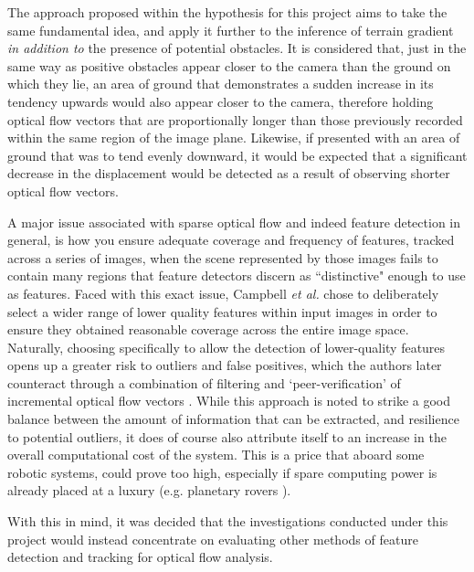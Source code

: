 The approach proposed within the hypothesis for this project aims to take the same fundamental idea, and apply it further to the inference of terrain gradient \textit{in addition to} the presence of potential obstacles. It is considered that, just in the same way as positive obstacles appear closer to the camera than the ground on which they lie, an area of ground that demonstrates a sudden increase in its tendency upwards would also appear closer to the camera, therefore holding optical flow vectors that are proportionally longer than those previously recorded within the same region of the image plane. Likewise, if presented with an area of ground that was to tend evenly downward, it would be expected that a significant decrease in the displacement would be detected as a result of observing shorter optical flow vectors.  


A major issue associated with sparse optical flow and indeed feature detection in general, is how you ensure adequate coverage and frequency of features, tracked across a series of images, when the scene represented by those images fails to contain many regions that feature detectors discern as ``distinctive" enough to use as features. Faced with this exact issue, Campbell \textit{et al.} \cite{campbell} chose to deliberately select a wider range of lower quality features within input images in order to ensure they obtained reasonable coverage across the entire image space. Naturally, choosing specifically to allow the detection of lower-quality features opens up a greater risk to outliers and false positives, which the authors later counteract through a combination of filtering and `peer-verification' of incremental optical flow vectors \cite{campbell}. While this approach is noted to strike a good balance between the amount of information that can be extracted, and resilience to potential outliers, it does of course also attribute itself to an increase in the overall computational cost of the system. This is a price that aboard some robotic systems, could prove too high, especially if spare computing power is already placed at a luxury (e.g. planetary rovers \cite{mer}).

With this in mind, it was decided that the investigations conducted under this project would instead concentrate on evaluating other methods of feature detection and tracking for optical flow analysis. 


